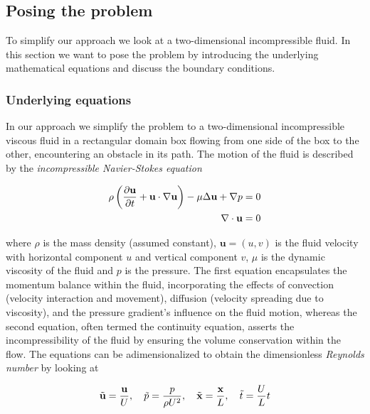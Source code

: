 \subsection{Posing the problem} \label{sec: posingProblem}
To simplify our approach we look at a two-dimensional incompressible fluid. In this section we want to pose the problem by introducing the underlying mathematical equations and discuss the boundary conditions.

\subsubsection*{Underlying equations}
In our approach we simplify the problem to a two-dimensional incompressible viscous fluid in a rectangular domain box flowing from one side of the box to the other, encountering an obstacle in its path. The motion of the fluid is described by the \textit{incompressible Navier-Stokes equation}

\begin{align}
  \rho \left( \frac{\partial \textbf{u}}{\partial t}  + \textbf{u} \cdot \nabla \textbf{u} \right)- \mu \Delta \textbf{u}+ \nabla p =0 \label{eq: incompressNS} \\
  \nabla\cdot \textbf{u} = 0 \notag
\end{align}

where $\rho$ is the mass density (assumed constant), $\textbf{u} = (u,v)$ is the fluid velocity with horizontal component $u$ and vertical component $v$, $\mu$ is the dynamic viscosity of the fluid and $p$ is the pressure. The first equation encapsulates the momentum balance within the fluid, incorporating the effects of convection (velocity interaction and movement), diffusion (velocity spreading due to viscosity), and the pressure gradient's influence on the fluid motion, whereas the second equation, often termed the continuity equation, asserts the incompressibility of the fluid by ensuring the volume conservation within the flow. The equations can be adimensionalized to obtain the dimensionless \textit{Reynolds number} by looking at

\begin{align}
  \Tilde{\textbf{u}} = \frac{\textbf{u}}{U}, \quad \Tilde{p} = \frac{p}{\rho U^2}, \quad \Tilde{\textbf{x}} = \frac{\textbf{x}}{L}, \quad \Tilde{t} = \frac{U}{L}t
\end{align}

